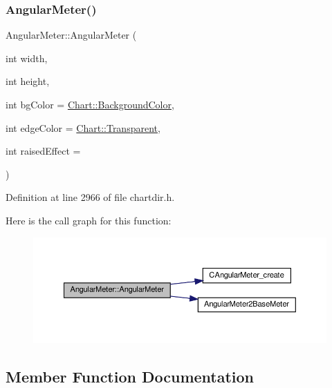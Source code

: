 \subsubsection{\texorpdfstring{Angular\+Meter()}{AngularMeter()}}
{\footnotesize\ttfamily Angular\+Meter\+::\+Angular\+Meter (\begin{DoxyParamCaption}\item[{int}]{width,  }\item[{int}]{height,  }\item[{int}]{bg\+Color = {\ttfamily \hyperlink{namespace_chart_abee0d882fdc9ad0b001245ad9fc64011a134193bde693b9d152d0c6dc59fa7d7f}{Chart\+::\+Background\+Color}},  }\item[{int}]{edge\+Color = {\ttfamily \hyperlink{namespace_chart_abee0d882fdc9ad0b001245ad9fc64011afc6811800a9e2582dac0157b6279f836}{Chart\+::\+Transparent}},  }\item[{int}]{raised\+Effect = {} }\end{DoxyParamCaption})\hspace{0.3cm}{\ttfamily [inline]}}



Definition at line 2966 of file chartdir.\+h.

Here is the call graph for this function\+:
\nopagebreak
\begin{figure}[H]
\begin{center}
\leavevmode
\includegraphics[width=350pt]{class_angular_meter_a5d71988b332dcbe883e7ad8d5abc0696_cgraph}
\end{center}
\end{figure}


\subsection{Member Function Documentation}
\mbox{\label{class_angular_meter_ade95bcd716c78e650ab625c3b6c0fa0c}} 

